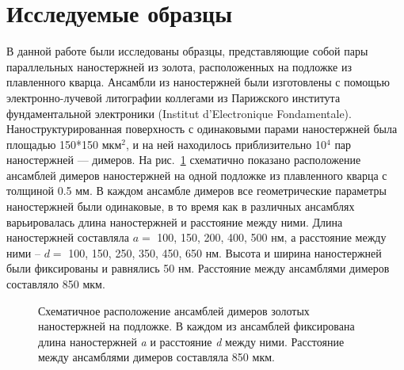 \section{Исследуемые образцы}

В данной работе были исследованы образцы, представляющие собой пары параллельных наностержней из золота, расположенных на подложке из плавленного кварца. Ансамбли из наностержней были изготовлены с помощью  электронно-лучевой литографии коллегами из Парижского института фундаментальной электроники (Institut d'Electronique Fondamentale). Наноструктурированная поверхность с одинаковыми парами наностержней была площадью 150*150 мкм$ ^2 $, и на ней находилось приблизительно 10$ ^4 $ пар наностержней --- димеров. 
На рис.~\ref{img:sample} схематично показано расположение ансамблей димеров наностержней на одной подложке из плавленного кварца с толщиной 0.5 мм. В каждом ансамбле димеров все геометрические параметры наностержней были одинаковые, в то время как в различных ансамблях варьировалась длина наностержней и расстояние между ними. Длина наностержней составляла $ a = $ 100, 150, 200, 400, 500 нм, а расстояние между ними -- $ d = $ 100, 150, 250, 350, 450, 650 нм. Высота и ширина наностержней были фиксированы и равнялись 50 нм. Расстояние между ансамблями димеров составляло 850 мкм. 
\begin{figure}[!h]
\caption{Схематичное расположение ансамблей димеров золотых наностержней на подложке. В каждом из ансамблей фиксирована длина наностержней \textit{a} и расстояние \textit{d} между ними. Расстояние между ансамблями димеров составляла 850 мкм.}
\label{img:sample}
\end{figure}

